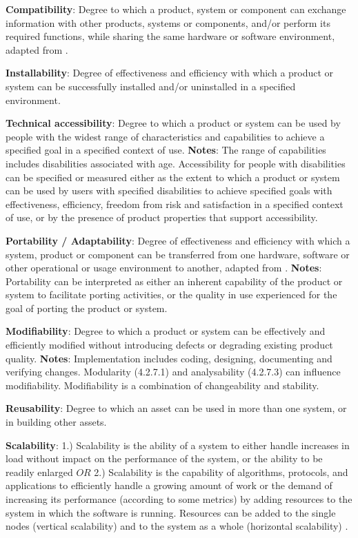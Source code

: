 \textbf{Compatibility}: Degree to which a product, system or component can exchange information with other products, systems or components, and/or perform its required functions, while sharing the same hardware or software environment, adapted from \cite{iso_central_secretary_isoiecieee_2010}.

\textbf{Installability}: Degree of effectiveness and efficiency with which a product or system can be successfully installed and/or uninstalled in a specified environment.

\textbf{Technical accessibility}: Degree to which a product or system can be used by people with the widest range of characteristics and capabilities to achieve a specified goal in a specified context of use. \textbf{Notes}: The range of capabilities includes disabilities associated with age. Accessibility for people with disabilities can be specified or measured either as the extent to which a product or system can be used by users with specified disabilities to achieve specified goals with effectiveness, efficiency, freedom from risk and satisfaction in a specified context of use, or by the presence of product properties that support accessibility.

\textbf{Portability / Adaptability}: Degree of effectiveness and efficiency with which a system, product or component can be transferred from one hardware, software or other operational or usage environment to another, adapted from \cite{iso_central_secretary_isoiecieee_2010}. \textbf{Notes}: Portability can be interpreted as either an inherent capability of the product or system to facilitate porting activities, or the quality in use experienced for the goal of porting the product or system.

\textbf{Modifiability}: Degree to which a product or system can be effectively and efficiently modified without introducing defects or degrading existing product quality. \textbf{Notes}: Implementation includes coding, designing, documenting and verifying changes. Modularity (4.2.7.1) and analysability (4.2.7.3) can influence modifiability. Modifiability is a combination of changeability and stability.

\textbf{Reusability}: Degree to which an asset can be used in more than one system, or in building other assets.

\textbf{Scalability}: 1.) Scalability is the ability of a system to either handle increases in load without impact on the performance of the system, or the ability to be readily enlarged \cite{microsoft_2010} $OR$ 2.) Scalability is the capability of algorithms, protocols, and applications to efficiently handle a growing amount of work or the demand of increasing its performance (according to some metrics) by adding resources to the system in which the software is running. Resources can be added to the single nodes (vertical scalability) and to the system as a whole (horizontal scalability) \cite{bondi_2000}.

